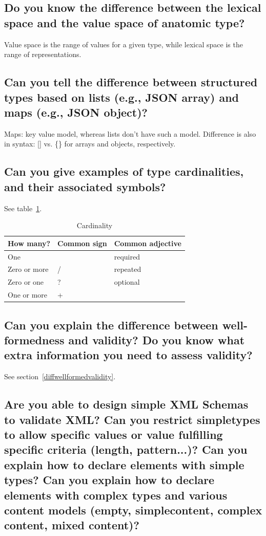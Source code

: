\documentclass{article}
\begin{document}
\subsection{Do you know the difference between the lexical space and the value space of anatomic type?}

Value space is the range of values for a given type, while lexical space is the range of representations.

\subsection{Can you tell the difference between structured types based on lists (e.g., JSON array) and maps (e.g., JSON object)?}

Maps: key value model, whereas lists don't have such a model. Difference is also in syntax: [] vs. \{\} for arrays and objects, respectively.

\subsection{Can you give examples of type cardinalities, and their associated symbols?}

See table~\ref{tab:card}.

\begin{table}
  \centering
  \begin{tabular}{lll}
    \toprule
    How many? & Common sign & Common adjective\\
    \midrule
    One &  & required\\
    Zero or more & / & repeated\\
    Zero or one & ? & optional\\
    One or more & + & \\
    \bottomrule
  \end{tabular}
  \caption{Cardinality}
  \label{tab:card}
\end{table}

\subsection{Can you explain the difference between well-formedness and validity? Do you know what extra information you need to assess validity?}

See section~\ref{diffwellformedvalidity}.


\subsection{Are you able to design simple XML Schemas to validate XML? Can you restrict simpletypes to allow specific values or value fulfilling specific criteria (length, pattern...)? Can you explain how to declare elements with simple types? Can you explain how to declare elements with complex types and various content models (empty, simplecontent, complex content, mixed content)?}
\end{document}

